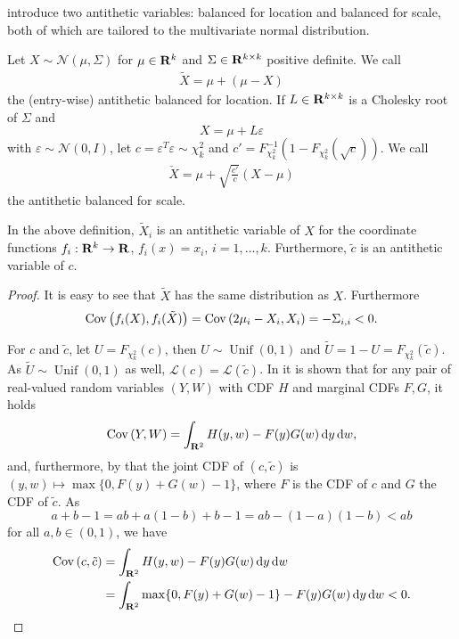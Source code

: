 \citep{Durbin1997Monte} introduce two antithetic variables: balanced for location and balanced for scale, both of which are tailored to the multivariate normal distribution. 
\begin{definition}
    Let $X\sim \mathcal N(\mu, \Sigma)$ for $\mu \in \mathbf R^{k}$ and $\Sigma \in \mathbf R^{k\times k}$ positive definite. We call
    \begin{align}
        \label{eq:antithetic-location}
    \tilde X = \mu + (\mu - X)
    \end{align}
    the (entry-wise) antithetic balanced for location. If $L\in\mathbf R^{k\times k}$ is a Cholesky root of $\Sigma$ and 
    $$
        X = \mu + L \varepsilon
    $$
    with $\varepsilon \sim \mathcal N(0, I)$, let $c = \varepsilon^{T}\varepsilon \sim \chi^{2}_k$ and $c' = F^{-1}_{\chi^{2}_{k}}(1 - F_{\chi^{2}_k}(\sqrt{c}))$. We call
    \begin{align}
        \label{eq:antithetic-scale}
        \check X = \mu + \sqrt{\frac{c'}{c}} \left( X - \mu \right)
    \end{align}
    the antithetic balanced for scale.
\end{definition}
\begin{lemma}
    In the above definition, $\tilde X_{i}$ is an antithetic variable of $X$ for the coordinate functions $f_{i}:\mathbf R^{k} \to \mathbf R$, $f_{i}(x) = x_{i}$, $i = 1, \dots, k$.
    Furthermore, $\tilde c$ is an antithetic variable of $c$.
\end{lemma}
\begin{proof}
    It is easy to see that $\tilde X$ has the same distribution as $X$. Furthermore 
    $$
        \operatorname{Cov} \left( f_{i}(X), f_{i}(\tilde X)\right) = \operatorname{Cov} \left( 2 \mu_{i} - X_{i}, X_{i} \right) = - \Sigma_{i,i} < 0.
    $$

    For $c$ and $\tilde c$, let $U = F_{\chi^{2}_{k}}(c)$, then $U \sim \operatorname{Unif}(0,1)$ and $\tilde U = 1 - U = F_{\chi^{2}_k}(\tilde c)$. 
    As $\tilde U \sim \operatorname{Unif}(0, 1)$ as well, $\mathcal L (c) = \mathcal L (\tilde c)$.
    In \citep[Lemma 2.3]{Whitt1976Bivariate} it is shown that for any pair of real-valued random variables $(Y,W)$ with CDF $H$ and marginal CDFs $F, G$, it holds
    $$
        \operatorname{Cov} \left(Y,W \right) = \int_{\mathbf R^{2}} H(y,w) - F(y)G(w) \,\mathrm d y \,\mathrm d w,
    $$
    and, furthermore, by \citep[Theorem 2.1 and Lemma 2.4]{Whitt1976Bivariate} that the joint CDF of $(c, \tilde c)$ is $(y,w) \mapsto \max \{0, F(y) + G(w) - 1\}$, where $F$ is the CDF of $c$ and $G$ the CDF of $\tilde c$. 
    As 
    $$
        a + b - 1 = ab + a(1-b) + b - 1 = ab - (1 - a)(1 - b) < ab
    $$
    for all $a,b \in (0,1)$, we have 
    \begin{align*}
        \operatorname{Cov} \left( c, \tilde c \right) &= \int_{\mathbf R^{2}} H(y,w) - F(y)G(w) \,\mathrm d y \,\mathrm d w \\
        &= \int_{\mathbf R^{2}} \max\{0, F(y) + G(w) - 1\} - F(y)G(w) \,\mathrm d y \,\mathrm d w < 0.
    \end{align*}
\end{proof}
